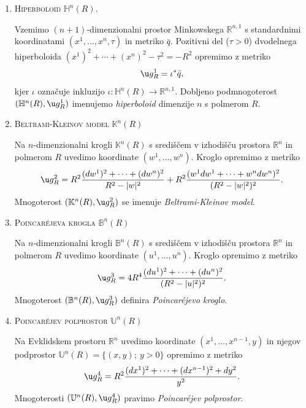 \documentclass[a4paper]{article}
\begin{document}
\begin{enumerate}
\item
\textsc{Hiperboloid} $\mathbb{H}^{n}(R)$.

Vzemimo $(n+1)$-dimenzionalni prostor Minkowskega $\mathbb{R}^{n,1}$ s standardnimi koordinatami $(x^{1}, \dots , x^{n}, \tau)$ in metriko $\bar{q}$.
Pozitivni del ($\tau > 0$) dvodelnega hiperboloida $(x^{1})^2 + \cdots + (x^{n})^2 - \tau^2 = -R^2$ opremimo z metriko
\begin{equation}\label{eq:H^n metrika}
\u g_{R}^{1} = \iota^{*}\bar{q},
\end{equation}
kjer $\iota$ označuje inkluzijo $\iota \colon \mathbb{H}^{n}(R) \to \mathbb{R}^{n,1}$. Dobljeno podmnogoterost $(\mathbb{H}^{n}(R), \u g_{R}^{1})$ imenujemo \emph{hiperboloid} dimenzije $n$ s polmerom $R$.

\item
\textsc{Beltrami-Kleinov model} $\mathbb{K}^{n}(R)$

Na $n$-dimenzionalni krogli $\mathbb{K}^{n}(R)$ s središčem v izhodišču prostora $\mathbb{R}^{n}$ in polmerom $R$ uvedimo koordinate $(w^{1}, \dots , w^{n})$. Kroglo opremimo z metriko
\begin{equation}\label{eq:K^n metrika}
\u g_{R}^{2} = R^2 \frac{(dw^{1})^2 + \cdots + (dw^{n})^2}{R^2-|w|^2} + R^2 \frac{(w^{1}dw^{1} + \cdots + w^{n}dw^{n})^2}{(R^2-|w|^2)^2}.
\end{equation}
Mnogoterost $(\mathbb{K}^{n}(R), \u g_{R}^{2})$ se imenuje \emph{Beltrami-Kleinov model}.

\item
\textsc{Poincar\'ejeva krogla} $\mathbb{B}^{n}(R)$

Na $n$-dimenzionalni krogli $\mathbb{B}^{n}(R)$ s središčem v izhodišču prostora $\mathbb{R}^{n}$ in polmerom $R$ uvedimo koordinate $(u^{1}, \dots , u^{n})$. Kroglo opremimo z metriko
\begin{equation}\label{eq:K^n metrika}
\u g_{R}^{3} = 4R^4 \frac{(du^{1})^2 + \cdots + (du^{n})^2}{(R^2-|u|^2)^2}.
\end{equation}
Mnogoterost $(\mathbb{B}^{n}(R), \u g_{R}^{3})$ definira \emph{Poincar\'ejevo kroglo}.

\item
\textsc{Poincar\'ejev polprostor} $\mathbb{U}^{n}(R)$

Na Evklidskem prostoru $\mathbb{R}^{n}$ uvedimo koordinate $(x^{1}, \dots , x^{n-1}, y)$ in njegov podprostor $\mathbb{U}^{n}(R) = \{ (x,y); \ y>0 \}$ opremimo z metriko
\begin{equation}\label{eq:K^n metrika}
\u g_{R}^{4} = R^2 \frac{(dx^{1})^2 + \cdots + (dx^{n-1})^2 + dy^2}{y^2}.
\end{equation}
Mnogoterosti $(\mathbb{U}^{n}(R), \u g_{R}^{4})$ pravimo \emph{Poincar\'ejev polprostor}.
%
\end{enumerate}
\end{document}
